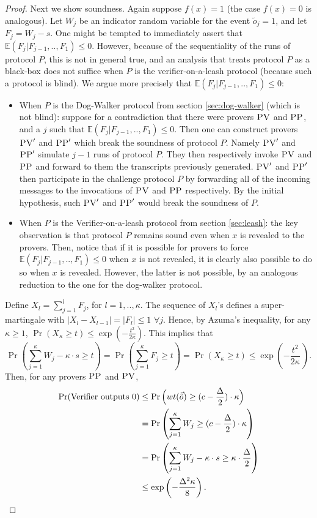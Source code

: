 \documentclass[11pt]{article}
\newcommand{\pv}{\textsc{PV}}
\newcommand{\pp}{\textsc{PP}}
\begin{document}
\begin{proof}
Next we show soundness.
Again suppose $f(x) = 1$ (the case $f(x) = 0$ is analogous). Let $W_j$ be an indicator random variable for the event $\tilde{o}_j = 1$, and let $F_j = W_j - s$. One might be tempted to immediately assert that $\mathbb{E}(F_j|F_{j-1},..,F_1) \leq 0$. However, because of the sequentiality of the runs of protocol $P$, this is not in general true, and an analysis that treats protocol $P$ as a black-box does not suffice when $P$ is the verifier-on-a-leash protocol (because such a protocol is blind). We argue more precisely that $\mathbb{E}(F_j|F_{j-1},..,F_1) \leq 0$:
\begin{itemize}
    \item When $P$ is the Dog-Walker protocol from section \ref{sec:dog-walker} (which is not blind): suppose for a contradiction that there were provers $\pv$ and $\pp$, and a $j$ such that $\mathbb{E}(F_j|F_{j-1},..,F_1) \leq 0$. Then one can construct provers $\pv'$ and $\pp'$ which break the soundness of protocol $P$. Namely $\pv'$ and $\pp'$ simulate $j-1$ runs of protocol $P$. They then respectively invoke $\pv$ and $\pp$ and forward to them the transcripts previously generated. $\pv'$ and $\pp'$ then participate in the challenge protocol $P$ by forwarding all of the incoming messages to the invocations of $\pv$ and $\pp$ respectively. By the initial hypothesis, such $\pv'$ and $\pp'$ would break the soundness of $P$.
    \item When $P$ is the Verifier-on-a-leash protocol from section \ref{sec:leash}: the key observation is that protocol $P$ remains sound even when $x$ is revealed to the provers. Then, notice that if it is possible for provers to force $\mathbb{E}(F_j|F_{j-1},..,F_1) \leq 0$ when $x$ is not revealed, it is clearly also possible to do so when $x$ is revealed. However, the latter is not possible, by an analogous reduction to the one for the dog-walker protocol. 
\end{itemize}
Define $X_l = \sum_{j=1}^l F_j$, for $l=1,..,\kappa$. The sequence of $X_l$'s defines a super-martingale with $|X_l-X_{l-1}| = |F_l| \leq 1 \,\, \forall j$.  Hence, by Azuma's inequality, for any $\kappa\geq 1$, $\Pr(X_\kappa \geq t) \leq \exp(-\frac{t^2}{2\kappa})$. This implies that 
\begin{equation*}
\Pr \left(\sum_{j=1}^{\kappa} W_j - \kappa \cdot s \geq t \right) = \Pr \left(\sum_{j=1}^{\kappa}F_j \geq t \right) = \Pr \left(X_{\kappa} \geq t \right) \leq \exp\left(-\frac{t^2}{2\kappa}\, \right).
\end{equation*}
Then, for any provers $\pp$ and $\pv$,
\begin{align*}
\Pr(\mbox{Verifier outputs $0$}) &\leq \Pr \Big(wt(\vec{\tilde{o}}) \geq (c - \frac{\Delta}{2})\cdot \kappa \Big) \\
&= \Pr \left(\sum_{j=1}^\kappa W_j \geq (c - \frac{\Delta}{2})\cdot \kappa \right) \\
&= \Pr \left(\sum_{j=1}^{\kappa} W_j - \kappa \cdot s \geq \kappa \cdot \frac{\Delta}{2} \right) \\
&\leq \exp \left(-\frac{\Delta^2\kappa}{8}\right). \qedhere
\end{align*}
\end{proof}
\end{document}
